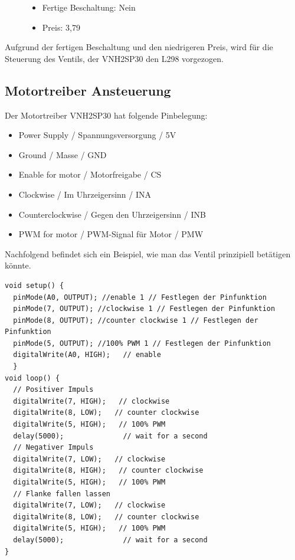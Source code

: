 \begin{figure}[!ht]
\begin{minipage}[t]{0.6\textwidth}
\begin{itemize}
	\item{Fertige Beschaltung: Nein}
	\item{Preis: 3,79\textsf{\texteuro}} %
\end{itemize}

\end{minipage}
\end{figure} 

Aufgrund der fertigen Beschaltung und den niedrigeren Preis, wird für die Steuerung des Ventils, der VNH2SP30 den L298 vorgezogen. 

\subsection{Motortreiber Ansteuerung}
\label{sec:motortreiberAnsteuerung}

Der Motortreiber VNH2SP30 hat folgende Pinbelegung:

\begin{itemize}
	\item{Power Supply / Spannungsversorgung / 5V}
	\item{Ground / Masse / GND}
	\item{Enable for motor / Motorfreigabe / CS}
	\item{Clockwise / Im Uhrzeigersinn / INA}
	\item{Counterclockwise / Gegen den Uhrzeigersinn / INB}
	\item{PWM for motor / PWM-Signal für Motor / PMW}
\end{itemize}

Nachfolgend befindet sich ein Beispiel, wie man das Ventil prinzipiell betätigen könnte.

\begin{lstlisting}[language=Arduino]
void setup() {
  pinMode(A0, OUTPUT); //enable 1 // Festlegen der Pinfunktion
  pinMode(7, OUTPUT); //clockwise 1 // Festlegen der Pinfunktion
  pinMode(8, OUTPUT); //counter clockwise 1 // Festlegen der Pinfunktion
  pinMode(5, OUTPUT); //100% PWM 1 // Festlegen der Pinfunktion
  digitalWrite(A0, HIGH);   // enable
  }
void loop() {
  // Positiver Impuls
  digitalWrite(7, HIGH);   // clockwise
  digitalWrite(8, LOW);   // counter clockwise 
  digitalWrite(5, HIGH);   // 100% PWM
  delay(5000);              // wait for a second
  // Negativer Impuls
  digitalWrite(7, LOW);   // clockwise
  digitalWrite(8, HIGH);   // counter clockwise 
  digitalWrite(5, HIGH);   // 100% PWM 
  // Flanke fallen lassen
  digitalWrite(7, LOW);   // clockwise
  digitalWrite(8, LOW);   // counter clockwise 
  digitalWrite(5, HIGH);   // 100% PWM
  delay(5000);              // wait for a second
}
\end{lstlisting}


